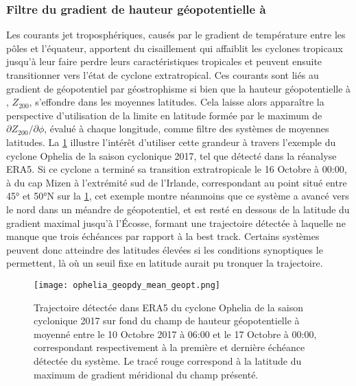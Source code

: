 \documentclass[../main.tex]{subfiles}
\begin{document}
\subsubsection*{Filtre du gradient de hauteur géopotentielle à }

Les courants jet troposphériques, causés par le gradient de température entre les pôles et l'équateur, apportent du cisaillement qui affaiblit les cyclones
tropicaux jusqu'à leur faire perdre leurs caractéristiques tropicales et peuvent ensuite transitionner vers l'état de cyclone extratropical. Ces courants sont
liés au gradient de géopotentiel par géostrophisme si bien que la hauteur géopotentielle à , $Z_{200}$, s'effondre dans les moyennes latitudes. Cela
laisse alors apparaître la perspective d'utilisation de la limite en latitude formée par le maximum de $\partial Z_{200} / \partial \phi$, évalué à chaque
longitude, comme filtre des systèmes de moyennes latitudes. La \cref{fig:ophelia_z200} illustre l'intérêt d'utiliser cette grandeur à travers l'exemple du
cyclone Ophelia de la saison cyclonique 2017, tel que détecté dans la réanalyse ERA5. Si ce cyclone a terminé sa transition extratropicale le 16 Octobre à
00:00, à  du cap Mizen à l'extrémité sud de l'Irlande, correspondant au point situé entre \ang{45} et \ang{50}N sur la \cref{fig:ophelia_z200}, cet
exemple montre néanmoins que ce système a avancé vers le nord dans un méandre de géopotentiel, et est resté en dessous de la latitude du gradient maximal
jusqu'à l'Écosse, formant une trajectoire détectée à laquelle ne manque que trois échéances par rapport à la best track. Certains systèmes peuvent donc
atteindre des latitudes élevées si les conditions synoptiques le permettent, là où un seuil fixe en latitude aurait pu tronquer la trajectoire.

\begin{figure}[htpb]
    \centering
    \texttt{[image: ophelia\_geopdy\_mean\_geopt.png]}
    \caption{Trajectoire détectée dans ERA5 du cyclone Ophelia de la saison cyclonique 2017 sur fond du champ de hauteur géopotentielle à  moyenné
    entre le 10 Octobre 2017 à 06:00 et le 17 Octobre à 00:00, correspondant respectivement à la première et dernière échéance détectée du système. Le tracé
    rouge correspond à la latitude du maximum de gradient méridional du champ présenté.}
    \label{fig:ophelia_z200}
\end{figure}
\end{document}
